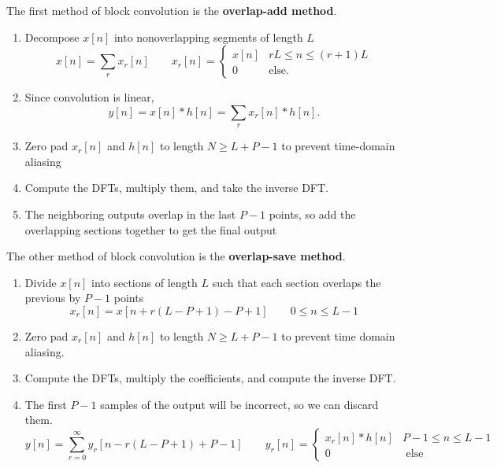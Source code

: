 The first method of block convolution is the \textbf{overlap-add method}.
\begin{enumerate}
  \item Decompose $x[n]$ into nonoverlapping segments of length $L$
  \[ 
	x[n] = \sum_{r}x_r[n] \qquad
	x_r[n] =
    \begin{cases}
      x[n] & rL \le n \le (r+1)L\\
	  0 & \text{else}.
    \end{cases}
  \]
  \item Since convolution is linear,
  \[
	y[n] = x[n]*h[n]=\sum_r{x_r[n]*h[n]}.
  \]
  \item Zero pad $x_r[n]$ and $h[n]$ to length $N\ge L+P-1$ to prevent time-domain aliasing
  \item Compute the DFTs, multiply them, and take the inverse DFT.
  \item The neighboring outputs overlap in the last $P-1$ points, so add the overlapping sections together to get the final output  
\end{enumerate}
The other method of block convolution is the \textbf{overlap-save method}.
\begin{enumerate}
  \item Divide $x[n]$ into sections of length $L$ such that each section overlaps the previous by $P-1$ points
  \[
	x_r[n]=x[n+r(L-P+1)-P+1] \qquad 0 \le n \le L-1
  \]
  \item Zero pad $x_r[n]$ and $h[n]$ to length $N\ge L+P-1$ to prevent time domain aliasing.
  \item Compute the DFTs, multiply the coefficients, and compute the inverse DFT.
  \item The first $P-1$ samples of the output will be incorrect, so we can discard them.
  \[
    y[n]=\sum_{r=0}^{\infty}y_r[n-r(L-P+1)+P-1] \qquad
    y_r[n]=
    \begin{cases}
      x_r[n]*h[n] & P-1\le n \le L-1\\
      0 & \text{ else}
    \end{cases}
  \]
\end{enumerate}
